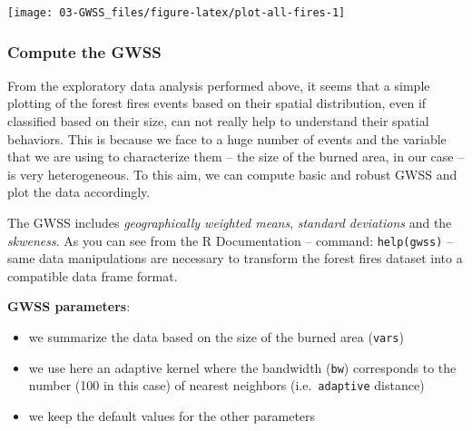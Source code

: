 \documentclass[
]{article}
\newenvironment{Shaded}{\begin{snugshade}}{\end{snugshade}}
\newcommand{\AttributeTok}[1]{\textcolor[rgb]{0.13,0.29,0.53}{#1}}
\newcommand{\CommentTok}[1]{\textcolor[rgb]{0.56,0.35,0.01}{\textit{#1}}}
\newcommand{\DecValTok}[1]{\textcolor[rgb]{0.00,0.00,0.81}{#1}}
\newcommand{\FunctionTok}[1]{\textcolor[rgb]{0.13,0.29,0.53}{\textbf{#1}}}
\newcommand{\NormalTok}[1]{#1}
\newcommand{\OtherTok}[1]{\textcolor[rgb]{0.56,0.35,0.01}{#1}}
\newcommand{\SpecialCharTok}[1]{\textcolor[rgb]{0.81,0.36,0.00}{\textbf{#1}}}
\providecommand{\tightlist}{%
  \setlength{\itemsep}{0pt}\setlength{\parskip}{0pt}}
\begin{document}
\begin{center}\texttt{[image: 03-GWSS\_files/figure-latex/plot-all-fires-1]} \end{center}

\subsubsection{Compute the GWSS}\label{compute-the-gwss}

From the exploratory data analysis performed above, it seems that a simple plotting of the forest fires events based on their spatial distribution, even if classified based on their size, can not really help to understand their spatial behaviors. This is because we face to a huge number of events and the variable that we are using to characterize them -- the size of the burned area, in our case -- is very heterogeneous. To this aim, we can compute basic and robust GWSS and plot the data accordingly.

The GWSS includes \emph{geographically weighted means}, \emph{standard deviations} and the \emph{skweness}. As you can see from the R Documentation -- command: \texttt{help(gwss)} -- same data manipulations are necessary to transform the forest fires dataset into a compatible data frame format.

\begin{Shaded}
\end{Shaded}

\textbf{GWSS parameters}:

\begin{itemize}
\tightlist
\item
  we summarize the data based on the size of the burned area (\texttt{vars})
\item
  we use here an adaptive kernel where the bandwidth (\texttt{bw}) corresponds to the number (100 in this case) of nearest neighbors (i.e.~\texttt{adaptive} distance)
\item
  we keep the default values for the other parameters
\end{itemize}
\end{document}
